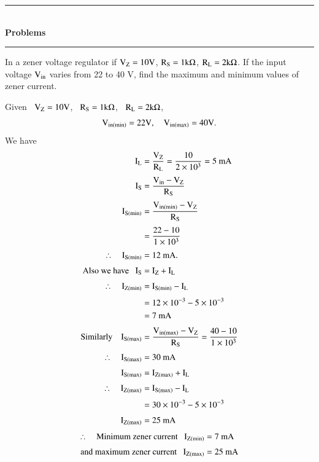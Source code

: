 \medskip
\begin{center}
\rule{4cm}{1pt}\\
{\bf\Large Problems}\\[-3pt]
\rule{4cm}{1pt}
\end{center}

\begin{problem}\label{prob1.27}
In a zener voltage regulator if $\textrm{V}_{\textrm{Z}}=10\textrm{V}$, $\textrm{R}_{\textrm{S}}=1\textrm{k}\Omega$, $\textrm{R}_{\textrm{L}}=2\textrm{k}\Omega$. If the input voltage $\textrm{V}_{\text{in}}$ varies from 22 to 40 V, find the maximum and minimum values of zener current.
\end{problem}

\begin{solution}
Given~ $\textrm{V}_{\textrm{Z}}=10\textrm{V}$, \ $\textrm{R}_{\textrm{S}}=1\textrm{k}\Omega$,  \ $\textrm{R}_{\textrm{L}}=2\textrm{k}\Omega$,
$$
\textrm{V}_{\text{in}(\min)}=22\textrm{V},\quad \textrm{V}_{\text{in}(\max)}=40\textrm{V}.
$$
We have
\begin{align*}
\textrm{I}_{\textrm{L}} &= \frac{\textrm{V}_{\textrm{Z}}}{\textrm{R}_{\textrm{L}}}=\frac{10}{2\times 10^{3}}=5\text{~mA}\\[3pt]
\textrm{I}_{\textrm{S}} &= \frac{\textrm{V}_{\text{in}}-\textrm{V}_{\textrm{Z}}}{\textrm{R}_{\textrm{S}}}\\[3pt]
\textrm{I}_{\textrm{S}(\min)} &= \frac{\textrm{V}_{\text{in}(\min)}-\textrm{V}_{\textrm{Z}}}{\textrm{R}_{\textrm{S}}}\\[3pt]
&= \frac{22-10}{1\times 10^{3}}\\[3pt]
\therefore\quad \textrm{I}_{\textrm{S}(\min)} &= 12\text{~mA}.\\[3pt]
\text{Also we have~~ } \textrm{I}_{\textrm{S}} &= \textrm{I}_{\textrm{Z}}+\textrm{I}_{\textrm{L}}\\[3pt]
\therefore\quad \textrm{I}_{\textrm{Z}(\min)} &= \textrm{I}_{\textrm{S}(\min)}-\textrm{I}_{\textrm{L}}\\[3pt]
&= 12\times 10^{-3}-5\times 10^{-3}\\
&= 7\text{~mA}\\[3pt]
\text{Similarly}\quad \textrm{I}_{\textrm{S}(\max)} &= \frac{\textrm{V}_{\text{in}(\max)}-\textrm{V}_{\textrm{Z}}}{\textrm{R}_{\textrm{S}}}=\dfrac{40-10}{1\times 10^{3}}\\[3pt]
\therefore\quad \textrm{I}_{\textrm{S}(\max)} &= 30\text{~mA}\\[3pt]
\textrm{I}_{\textrm{S}(\max)} &= \textrm{I}_{\textrm{Z}(\max)}+\textrm{I}_{\textrm{L}}\\[3pt]
\therefore\quad \textrm{I}_{\textrm{Z}(\max)} &= \textrm{I}_{\textrm{S}(\max)}-\textrm{I}_{\textrm{L}}\\[3pt]
&= 30\times 10^{-3}-5\times 10^{-3}\\[3pt]
\textrm{I}_{\textrm{Z}(\max)} &= 25\text{~mA}
\end{align*}
\begin{align*}
\therefore\quad \text{Minimum zener current~~ } \textrm{I}_{\textrm{Z}(\min)} &= 7\text{~mA}\\[3pt]
\text{and maximum zener current~~ } \textrm{I}_{\textrm{Z}(\max)} &= 25\text{~mA}
\end{align*}
\end{solution}

